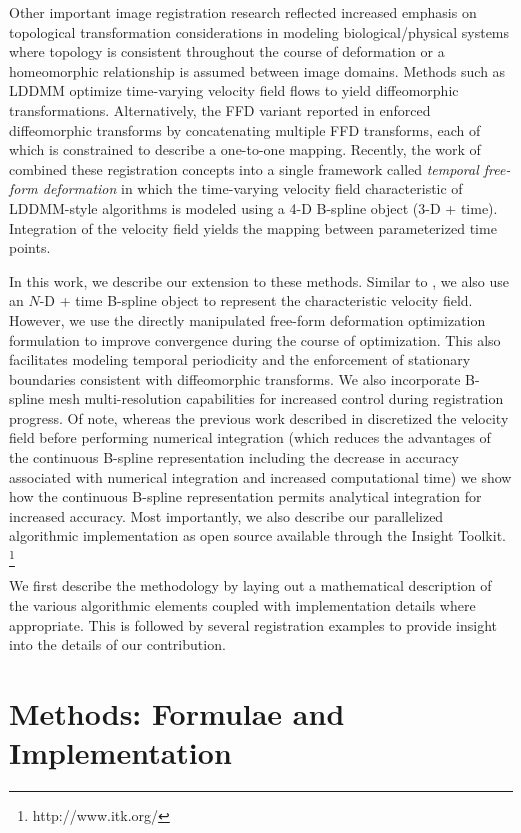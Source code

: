 \documentclass{llncs}
\begin{document}
Other important image registration research
reflected increased emphasis on topological transformation considerations
in modeling biological/physical systems where topology is 
consistent throughout the course of deformation or a 
homeomorphic relationship is assumed between image domains.
Methods such as LDDMM \cite{beg2005} optimize time-varying velocity field 
flows to yield diffeomorphic transformations.  Alternatively, the FFD 
variant reported in \cite{rueckert2006} enforced diffeomorphic transforms
by concatenating multiple FFD transforms, each of which is constrained
to describe a one-to-one mapping.
Recently, the work of 
\cite{de-craene2011} combined these registration concepts into a single
framework called {\em temporal free-form deformation} in which the 
time-varying velocity field characteristic of LDDMM-style algorithms
is modeled using a 4-D B-spline object (3-D + time).  Integration of 
the velocity field yields the mapping between parameterized time points.

In this work, we describe our extension to these methods.  Similar to 
\cite{de-craene2011}, we also use an $N$-D + time B-spline object to 
represent the characteristic velocity field.  However, we use the 
directly manipulated free-form deformation optimization formulation to improve 
convergence during the course of optimization.  This also facilitates
modeling temporal periodicity and
the enforcement of stationary boundaries consistent with diffeomorphic
transforms.
We also incorporate B-spline mesh multi-resolution capabilities
for increased control during registration progress.  Of note, whereas the 
previous work described in \cite{de-craene2011} discretized the velocity field before 
performing numerical integration (which reduces the advantages of the continuous
B-spline representation including the decrease in accuracy associated with
numerical integration and increased computational time) we show how the continuous B-spline 
representation permits analytical integration for increased accuracy.  
Most importantly, we also describe
our parallelized algorithmic implementation as open source available through the Insight Toolkit.%
\footnote{
http://www.itk.org/
}

We first describe the methodology by laying out a mathematical description 
of the various algorithmic elements coupled with implementation details
where appropriate.  This is followed by several registration examples
to provide insight into the details of our contribution. 

\section{Methods: Formulae  and Implementation}
\end{document}
